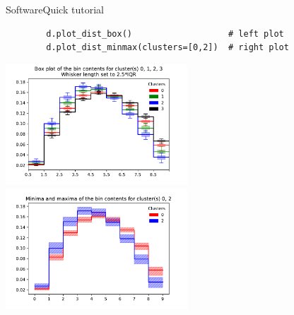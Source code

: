 \begin{frame}[fragile]{Software}{Quick tutorial}
    \begin{verbatim}
        d.plot_dist_box()                   # left plot
        d.plot_dist_minmax(clusters=[0,2])  # right plot
    \end{verbatim}
    
    \bigskip
    \begin{changemargin}{-1.2cm}{-1.2cm}
        \includegraphics[width=6.8cm]{figures/plots/box_plot.pdf}\hspace{-0.5cm}
        \includegraphics[width=6.8cm]{figures/plots/plot_minmax_02.pdf}\\
    \end{changemargin}
\end{frame}
